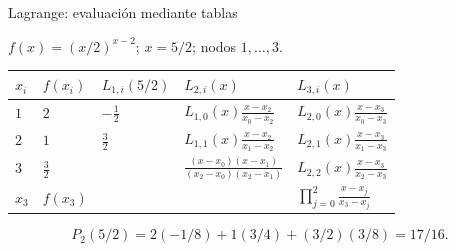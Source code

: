 \documentclass[main.tex]{subfiles}
\begin{document}
\begin{frame}[t]{Lagrange: evaluación mediante tablas}
\par\noindent\begin{minipage}[t][12mm][t]{\textwidth}\small\strut $f(x)=(x/2)^{x-2}$; $x=5/2$; nodos $1,\ldots,3$.\end{minipage}\par\nointerlineskip
\begin{minipage}[t]{\textwidth}\begingroup\scriptsize\setlength{\tabcolsep}{3pt}\begin{center}\begin{tabular}{|C{.065\textwidth}|C{.095\textwidth}|C{.19\textwidth}|C{.25\textwidth}|C{.25\textwidth}|}\hline
\rule[-2mm]{0pt}{6mm}$x_i$&$f(x_i)$&$L_{1,i}(5/2)$&$L_{2,i}(x)$&$L_{3,i}(x)$\\\hline
\rule[-2.5mm]{0pt}{9mm}$1$&$2$&$-\frac12$&$L_{1,0}(x)\frac{x-x_2}{x_0-x_2}$&$L_{2,0}(x)\frac{x-x_3}{x_0-x_3}$\\\hline
\rule[-2.5mm]{0pt}{9mm}$2$&$1$&$\frac32$&$L_{1,1}(x)\frac{x-x_2}{x_1-x_2}$&$L_{2,1}(x)\frac{x-x_3}{x_1-x_3}$\\\hline
\rule[-2.5mm]{0pt}{9mm}$3$&$\frac{3}{2}$&&$\frac{(x-x_0)(x-x_1)}{(x_2-x_0)(x_2-x_1)}$&$L_{2,2}(x)\frac{x-x_3}{x_2-x_3}$\\\hline
\rule[-2.5mm]{0pt}{9mm}$x_3$&$f(x_3)$&&&$\prod_{j=0}^2\frac{x-x_j}{x_3-x_j}$\\\hline
\end{tabular}\end{center}\endgroup\par
\end{minipage}\par\[P_2(5/2)=2(-1/8)+1(3/4)+(3/2)(3/8)=17/16.\]
\end{frame}
\end{document}
